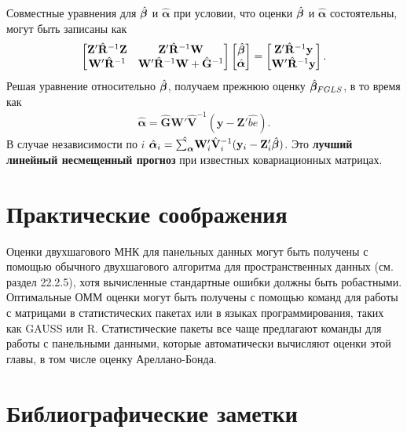 Совместные  уравнения для $\hat{\bm{\beta}}$ и $\hat{\bm\alpha}$ при условии, что   оценки $\hat{\bm{\beta}}$ и $\hat{\bm\alpha}$ состоятельны, могут быть записаны как
\begin{align}
\begin{bmatrix}
\mathbf Z' \hat{\mathbf R}^{-1} \mathbf Z & \mathbf Z' \hat{\mathbf R}^{-1} \mathbf W \\
\mathbf W' \hat{\mathbf R}^{-1} & \mathbf W' \hat{\mathbf R}^{-1} \mathbf W + \hat{\mathbf G}^{-1}
\end{bmatrix}
\begin{bmatrix}
\hat{\bm{\beta}} \\
\hat{\bm\alpha}
\end{bmatrix}
=
\begin{bmatrix}
\mathbf Z' \hat{\mathbf R}^{-1} \mathbf y \\
\mathbf W' \hat{\mathbf R}^{-1} \mathbf y
\end{bmatrix}.
\nonumber
\end{align}
Решая уравнение относительно $\hat{\bm{\beta}}$, получаем прежнюю оценку $\hat{\bm{\beta}}_{FGLS}$, в то время как
\begin{align}
\hat{\bm\alpha}=\hat{\mathbf G} \mathbf W' \hat{\mathbf V}^{-1} (\mathbf y - \mathbf Z' \hat{be}).
\nonumber
\end{align}
В случае независимости по $i$ $\hat{\bm\alpha}_i=\hat{\sum_{\bm\alpha}}\mathbf W'_i \hat{\mathbf V}_i^{-1} (\mathbf y_i - \mathbf Z'_i \hat{\bm{\beta}})$. Это \textbf{лучший линейный несмещенный прогноз} при известных ковариационных матрицах.


\section{Практические соображения}

Оценки двухшагового МНК для панельных данных могут быть получены с помощью обычного двухшагового алгоритма для пространственных данных (см. раздел 22.2.5), хотя вычисленные стандартные ошибки должны быть робастными. Оптимальные ОММ оценки могут быть получены с помощью команд для работы с матрицами в статистических пакетах или в языках программирования, таких как GAUSS или R. Статистические пакеты все чаще предлагают команды для работы с панельными данными, которые автоматически вычисляют оценки этой главы, в том числе оценку Ареллано-Бонда.

\section{Библиографические заметки}

